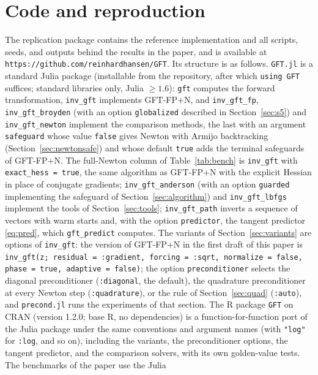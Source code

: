 \documentclass[11pt]{article}
\begin{document}
\section{Code and reproduction}\label{sec:s1}

The replication package contains the reference implementation and all
scripts, seeds, and outputs behind the results in the paper, and is
available at \texttt{https://github.com/reinhardhansen/GFT}. Its
structure is as follows. \texttt{GFT.jl} is a standard Julia package
(installable from the repository, after which \texttt{using GFT}
suffices; standard libraries only, Julia $\geq1.6$):
\texttt{gft} computes the forward
transformation, \texttt{inv\_gft} implements GFT-FP+N, and
\texttt{inv\_gft\_fp}, \texttt{inv\_gft\_broyden} (with an option
\texttt{globalized} described in Section~\ref{sec:s5}) and
\texttt{inv\_gft\_newton} implement the comparison methods, the
last with an argument \texttt{safeguard} whose value \texttt{false}
gives Newton with Armijo backtracking (Section~\ref{sec:newtonsafe}) and
whose default \texttt{true} adds the terminal safeguards of GFT-FP+N.
The full-Newton column of Table~\ref{tab:bench} is \texttt{inv\_gft}
with \texttt{exact\_hess = true}, the same algorithm as GFT-FP+N with
the explicit Hessian in place of conjugate gradients;
\texttt{inv\_gft\_anderson} (with an option \texttt{guarded}
implementing the safeguard of Section~\ref{sec:algorithm}) and
\texttt{inv\_gft\_lbfgs} implement the tools of
Section~\ref{sec:tools}; \texttt{inv\_gft\_path} inverts a sequence
of vectors with warm starts and, with the option \texttt{predictor},
the tangent predictor \eqref{eq:pred}, which \texttt{gft\_predict}
computes. The variants of Section~\ref{sec:variants} are options of
\texttt{inv\_gft}: the version of GFT-FP+N in the first draft of this
paper is \texttt{inv\_gft(z; residual = :gradient, forcing = :sqrt,
normalize = false, phase = true, adaptive = false)}; the option
\texttt{preconditioner} selects the diagonal preconditioner
(\texttt{:diagonal}, the default), the quadrature preconditioner at
every Newton step (\texttt{:quadrature}), or the rule of
Section~\ref{sec:quad} (\texttt{:auto}), and \texttt{precond.jl}
runs the experiments of that section. The R package
\texttt{GFT} on CRAN (version 1.2.0; base R, no dependencies) is a
function-for-function port of the Julia package under the same
conventions and argument names (with \texttt{"log"} for
\texttt{:log}, and so on), including the variants, the preconditioner
options, the tangent predictor, and the comparison solvers, with its
own golden-value tests. The benchmarks of the paper use the Julia
\end{document}
